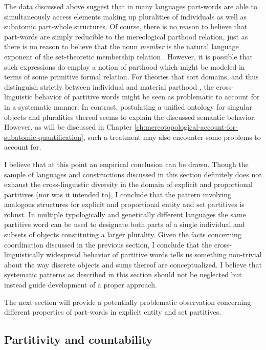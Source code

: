 The data discussed above suggest that in many languages part-words are able to simultaneously access elements making up pluralities of individuals as well as subatomic part-whole structures. Of course, there is no reason to believe that part-words are simply reducible to the mereological parthood relation, just as there is no reason to believe that the noun \textit{member} is the natural language exponent of the set-theoretic membership relation \citep[see][]{champollion2010parts,champollion2017parts}. However, it is possible that such expressions do employ a notion of parthood which might be modeled in terms of some primitive formal relation. For theories that sort domains, and thus distinguish strictly between individual and material parthood \citep[e.g.,][]{link1983logical}, the cross-linguistic behavior of partitive words might be seen as problematic to account for in a systematic manner. In contrast, postulating a unified ontology for singular objects and pluralities thereof seems to explain the discussed semantic behavior. However, as will be discussed in Chapter \ref{ch:mereotopological-account-for-subatomic-quantification}, such a treatment may also encounter some problems to account for.\largerpage[1.75]

I believe that at this point an empirical conclusion can be drawn. Though the sample of languages and constructions discussed in this section definitely does not exhaust the cross-linguistic diversity in the domain of explicit and proportional partitives (nor was it intended to), I conclude that the pattern involving analogous structures for explicit and proportional entity and set partitives is robust. In multiple typologically and genetically different languages the same partitive word can be used to designate both parts of a single individual and subsets of objects constituting a larger plurality. Given the facts concerning coordination discussed in the previous section, I conclude that the cross-linguistically widespread behavior of partitive words tells us something non-trivial about the way discrete objects and sums thereof are conceptualized. I believe that systematic patterns as described in this section should not be neglected but instead guide development of a proper approach. 

The next section will provide a potentially problematic observation concerning different properties of part-words in explicit entity and set partitives. 

\subsection{Partitivity and countability}\label{sec:partitivity-and-countability}

